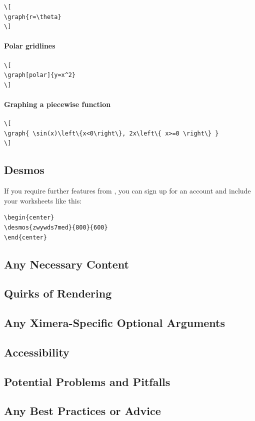 \documentclass{ximera}
\begin{document}
  
\begin{verbatim}
\[
\graph{r=\theta}
\]
\end{verbatim}
\paragraph{Polar gridlines}


\begin{verbatim}
\[
\graph[polar]{y=x^2}
\]
\end{verbatim}
\paragraph{Graphing a piecewise function}


\begin{verbatim}
\[
\graph{ \sin(x)\left\{x<0\right\}, 2x\left\{ x>=0 \right\} }
\]
\end{verbatim}


\subsection{Desmos}

If you require further features from
, you can sign up for an account
and include your worksheets like this:

\begin{verbatim}
\begin{center}
\desmos{zwywds7med}{800}{600}
\end{center}
\end{verbatim}
\begin{center}
\end{center}



    \subsection*{Any Necessary Content}
    
    
    
    \subsection*{Quirks of Rendering}
    
    
    
    \subsection*{Any Ximera-Specific Optional Arguments}
    
    
    
    \subsection*{Accessibility}
    
    
    
    \subsection*{Potential Problems and Pitfalls}
    
    
    
    \subsection*{Any Best Practices or Advice}
    
    

    
\end{document}
